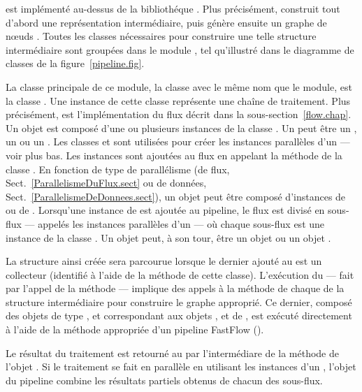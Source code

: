  est impl\'ement\'e au-dessus de la biblioth\'eque . Plus précisément,  construit tout d'abord une repr\'esentation interm\'ediaire, puis g\'en\`ere ensuite un graphe de n\oe{}uds . Toutes les classes n\'ecessaires pour construire une telle structure interm\'ediaire sont group\'ees dans le module , tel qu'illustr\'e dans le diagramme de classes de la figure~\ref{pipeline.fig}.

La classe principale de ce module, la classe avec le m\^eme nom que le module, est la classe . Une instance de cette classe repr\'esente une cha\^ine de traitement. Plus pr\'ecis\'ement,  est l'impl\'ementation du flux  d\'ecrit dans la sous-section~\ref{flow.chap}. Un objet  est compos\'e d'une ou plusieurs instances de la classe . Un  peut \^etre un , un  ou un . Les classes  et  sont utilis\'ees pour cr\'eer les instances parall\`eles d'un  — voir plus bas. Les instances  sont ajout\'ees au flux en appelant la m\'ethode  de la classe . En fonction de type de parall\'elisme (de flux, Sect.~\ref{ParallelismeDuFlux.sect} ou de donn\'ees, Sect.~\ref{ParallelismeDeDonnees.sect}), un objet  peut \^etre compos\'e d'instances de  ou  de . Lorsqu'une instance de  est ajout\'ee au {pipeline}, le flux est divis\'e en sous-flux --- appel\'es les instances parall\`eles d'un  --- où chaque sous-flux est une instance de la classe . Un objet  peut, \`a son tour, \^etre un objet  ou un objet .

La structure ainsi cr\'e\'ee sera parcourue lorsque le dernier  ajout\'e au  est un collecteur (identifi\'e \`a l'aide de la m\'ethode  de cette classe). L'ex\'ecution du  –-- fait par l'appel de la m\'ethode  --- implique des appels \`a la m\'ethode  de chaque  de la structure intermédiaire pour construire le graphe  appropri\'e. Ce dernier, compos\'e des objets de type ,  et  correspondant aux objets ,  et  de , est ex\'ecut\'e directement à l'aide de la méthode appropriée d'un pipeline FastFlow ().

Le r\'esultat du traitement est retourn\'e au  par l'intermédiare de la méthode  de l'objet . Si le traitement se fait en parallèle en utilisant les instances d'un , l'objet  du pipeline combine les r\'esultats partiels obtenus de chacun des sous-flux.



